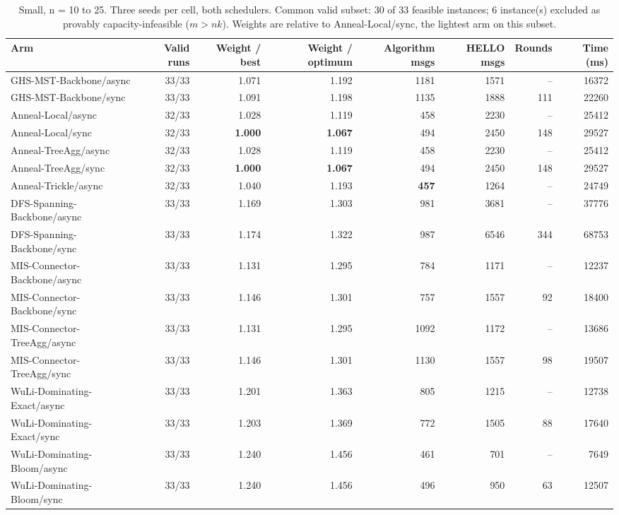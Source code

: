 \begin{table}[tb]
\centering
\caption{Small, n = 10 to 25. Three seeds per cell, both schedulers. Common valid subset: 30 of 33 feasible instances; 6 instance(s) excluded as provably capacity-infeasible ($m > nk$). Weights are relative to Anneal-Local/sync, the lightest arm on this subset.}
\label{tab:cmp-sweep_small_full_k6_clean}
\begin{tabular}{lrrrrrrr}
\toprule
Arm & Valid runs & Weight / best & Weight / optimum & Algorithm msgs & HELLO msgs & Rounds & Time (ms) \\
\midrule
GHS-MST-Backbone/async & 33/33 & 1.071 & 1.192 & 1181 & 1571 & -- & 16372 \\
GHS-MST-Backbone/sync & 33/33 & 1.091 & 1.198 & 1135 & 1888 & 111 & 22260 \\
Anneal-Local/async & 32/33 & 1.028 & 1.119 & 458 & 2230 & -- & 25412 \\
Anneal-Local/sync & 32/33 & \textbf{1.000} & \textbf{1.067} & 494 & 2450 & 148 & 29527 \\
Anneal-TreeAgg/async & 32/33 & 1.028 & 1.119 & 458 & 2230 & -- & 25412 \\
Anneal-TreeAgg/sync & 32/33 & \textbf{1.000} & \textbf{1.067} & 494 & 2450 & 148 & 29527 \\
Anneal-Trickle/async & 32/33 & 1.040 & 1.193 & \textbf{457} & 1264 & -- & 24749 \\
DFS-Spanning-Backbone/async & 33/33 & 1.169 & 1.303 & 981 & 3681 & -- & 37776 \\
DFS-Spanning-Backbone/sync & 33/33 & 1.174 & 1.322 & 987 & 6546 & 344 & 68753 \\
MIS-Connector-Backbone/async & 33/33 & 1.131 & 1.295 & 784 & 1171 & -- & 12237 \\
MIS-Connector-Backbone/sync & 33/33 & 1.146 & 1.301 & 757 & 1557 & 92 & 18400 \\
MIS-Connector-TreeAgg/async & 33/33 & 1.131 & 1.295 & 1092 & 1172 & -- & 13686 \\
MIS-Connector-TreeAgg/sync & 33/33 & 1.146 & 1.301 & 1130 & 1557 & 98 & 19507 \\
WuLi-Dominating-Exact/async & 33/33 & 1.201 & 1.363 & 805 & 1215 & -- & 12738 \\
WuLi-Dominating-Exact/sync & 33/33 & 1.203 & 1.369 & 772 & 1505 & 88 & 17640 \\
WuLi-Dominating-Bloom/async & 33/33 & 1.240 & 1.456 & 461 & 701 & -- & 7649 \\
WuLi-Dominating-Bloom/sync & 33/33 & 1.240 & 1.456 & 496 & 950 & 63 & 12507 \\

\end{tabular}
\end{table}
